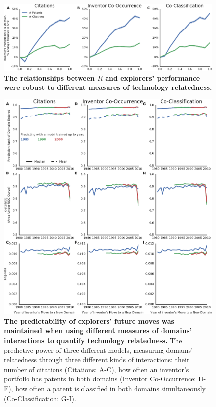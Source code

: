 \documentclass{dsj}
\begin{document}
\begin{figure}
\includegraphics[width=1.3\textwidth]{figs/performance_alternative_relatedness.pdf} 
\caption{\textbf{The relationships between $R$ and explorers' performance were robust to different measures of technology relatedness.}
}\label{alternative_R_comparisons_performance}
\end{figure}

\cleardoublepage

\begin{figure}[p]
\includegraphics[width=1.3\textwidth]{figs/prediction_alternative_relatedness.pdf} 
\caption{\textbf{The predictability of explorers' future moves was maintained when using different measures of domains' interactions to quantify technology relatedness.}  The predictive power of three different models, measuring domains' relatedness through three different kinds of interactions: their number of citations (Citations: A-C), how often an inventor's portfolio has patents in both domains (Inventor Co-Occurrence: D-F), how often a patent is classified in both domains simultaneously (Co-Classification:
G-I).
}\label{alternative_R_comparisons_prediction}
\end{figure}

\clearpage

\printbibliography[]%
\end{document}
